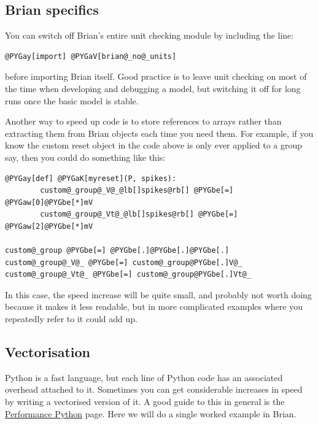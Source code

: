 \documentclass[letterpaper,10pt,english]{manual}
\begin{document}
\subsection{Brian specifics}

You can switch off Brian's entire unit checking module
by including the line:

\begin{Verbatim}[commandchars=@\[\]]
@PYGay[import] @PYGaV[brian@_no@_units]
\end{Verbatim}

before importing Brian itself. Good practice is to leave unit checking
on most of the time when developing and debugging a model, but
switching it off for long runs once the basic model is stable.

Another way to speed up code is to store references to arrays rather
than extracting them from Brian objects each time you need them. For
example, if you know the custom reset object in the code above is
only ever applied to a group  say, then you could
do something like this:

\begin{Verbatim}[commandchars=@\[\]]
@PYGay[def] @PYGaK[myreset](P, spikes):
        custom@_group@_V@_@lb[]spikes@rb[] @PYGbe[=] @PYGaw[0]@PYGbe[*]mV
        custom@_group@_Vt@_@lb[]spikes@rb[] @PYGbe[=] @PYGaw[2]@PYGbe[*]mV

custom@_group @PYGbe[=] @PYGbe[.]@PYGbe[.]@PYGbe[.]
custom@_group@_V@_ @PYGbe[=] custom@_group@PYGbe[.]V@_
custom@_group@_Vt@_ @PYGbe[=] custom@_group@PYGbe[.]Vt@_
\end{Verbatim}

In this case, the speed increase will be quite small, and probably
not worth doing because it makes it less readable, but in more
complicated examples where you repeatedly refer to 
it could add up.
\hypertarget{efficiency-vectorisation}{}

\subsection{Vectorisation}

Python is a fast language, but each line of Python code has an
associated overhead attached to it. Sometimes you can get considerable
increases in speed by writing a vectorised version of it. A good guide
to this in general is the \href{http://www.scipy.org/PerformancePython}{Performance Python}
page. Here we will do a single worked example in Brian.
\end{document}
